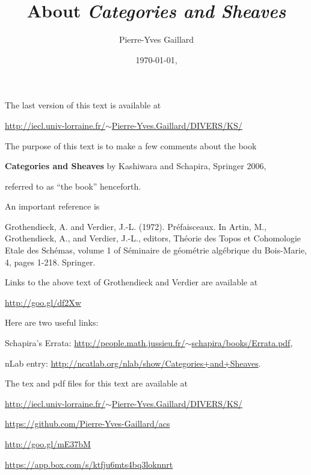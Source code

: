 \documentclass[12pt]{article}%
\title{About \em{Categories and Sheaves}}
\author{Pierre-Yves Gaillard}
\date{\today, \currenttime}
\theoremstyle{remark}
\theoremstyle{definition}
\newcommand{\nn}{\noindent}
\begin{document}
\maketitle

\nn The last version of this text is available at

\nn\href{http://iecl.univ-lorraine.fr/~Pierre-Yves.Gaillard/DIVERS/KS/}{http://iecl.univ-lorraine.fr/$\sim$Pierre-Yves.Gaillard/DIVERS/KS/}

\tableofcontents\newpage%

\nn The purpose of this text is to make a few comments about the book%

\textbf{Categories and Sheaves} by Kashiwara and Schapira, Springer 2006,%

\nn referred to as ``the book'' henceforth.%

An important reference is

\nn[GV] Grothendieck, A. and Verdier, J.-L. (1972). Pr\'efaisceaux. In Artin, M., Grothendieck, A., and Verdier, J.-L., editors, Th\'eorie des Topos et Cohomologie Etale des Sch\'emas, volume 1 of S\'eminaire de g\'eom\'etrie alg\'ebrique du Bois-Marie, 4, pages 1-218. Springer. 

Links to the above text of Grothendieck and Verdier are available at \smallskip

\centerline{\href{http://goo.gl/df2Xw}{http://goo.gl/df2Xw}}

Here are two useful links:

\nn Schapira's Errata: \href{http://people.math.jussieu.fr/~schapira/books/Errata.pdf}{http://people.math.jussieu.fr/$\sim$schapira/books/Errata.pdf},

\nn nLab entry: \href{http://ncatlab.org/nlab/show/Categories+and+Sheaves}{http://ncatlab.org/nlab/show/Categories+and+Sheaves}. 

The tex and pdf files for this text are available at
 
\nn\href{http://iecl.univ-lorraine.fr/~Pierre-Yves.Gaillard/DIVERS/KS/}{http://iecl.univ-lorraine.fr/$\sim$Pierre-Yves.Gaillard/DIVERS/KS/}

\nn\href{https://github.com/Pierre-Yves-Gaillard/acs}{https://github.com/Pierre-Yves-Gaillard/acs}

\nn\href{http://goo.gl/mE37bM}{http://goo.gl/mE37bM}

\nn\href{https://app.box.com/s/ktfju6mts4bq3loknnrt}{https://app.box.com/s/ktfju6mts4bq3loknnrt}
\end{document}
